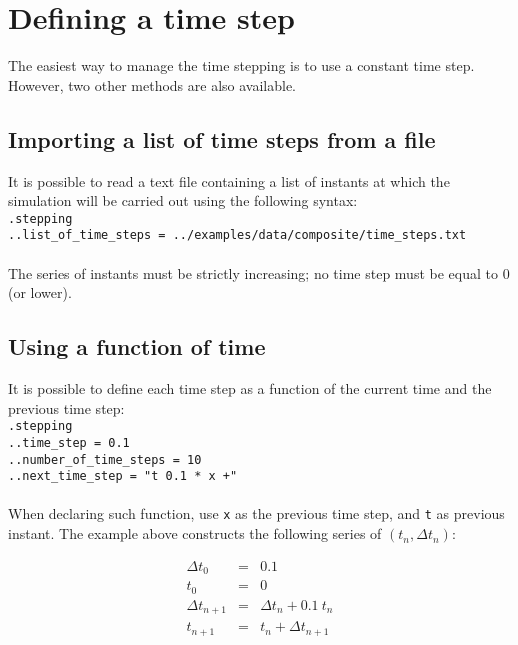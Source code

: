 \documentclass[10pt]{article}
\begin{document}
\section{Defining a time step}

The easiest way to manage the time stepping is to use a constant time step. However, two other methods are also available.

\subsection{Importing a list of time steps from a file}

It is possible to read a text file containing a list of instants at which the simulation will be carried out using the following syntax:\\

\noindent \verb+.stepping+\\
\verb+..list_of_time_steps = ../examples/data/composite/time_steps.txt+

\paragraph{} The series of instants must be strictly increasing; no time step must be equal to 0 (or lower).

\subsection{Using a function of time}

It is possible to define each time step as a function of the current time and the previous time step:\\

\noindent \verb+.stepping+\\
\verb+..time_step = 0.1+\\
\verb+..number_of_time_steps = 10+\\
\verb#..next_time_step = "t 0.1 * x +"#

\paragraph{} When declaring such function, use \verb+x+ as the previous time step, and \verb+t+ as previous instant. The example above constructs the following series of $(t_n, \Delta t_n)$:

\begin{eqnarray}
	\Delta t_0 & = & 0.1 \\
	t_0 & = & 0  \\
	\Delta t_{n+1} & = & \Delta t_n + 0.1\ t_n \\
	t_{n+1} & = & t_n + \Delta t_{n+1}
\end{eqnarray}
\end{document}
